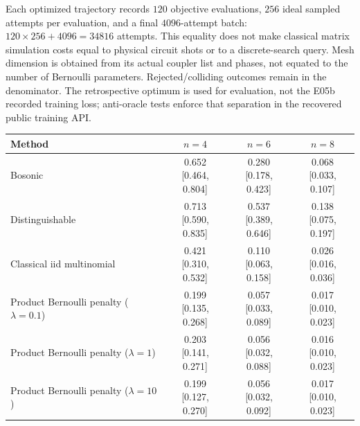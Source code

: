 \documentclass[11pt,a4paper]{article}
\theoremstyle{remark}\newtheorem{remark}[theorem]{Remark}
\begin{document}
Each optimized trajectory records $120$ objective evaluations, $256$ ideal sampled attempts per evaluation, and a final $4096$-attempt batch: $120\times256+4096=34816$ attempts. This equality does not make classical matrix simulation costs equal to physical circuit shots or to a discrete-search query. Mesh dimension is obtained from its actual coupler list and phases, not equated to the number of Bernoulli parameters. Rejected/colliding outcomes remain in the denominator. The retrospective optimum is used for evaluation, not the E05b recorded training loss; anti-oracle tests enforce that separation in the recovered public training API.

\begin{table}[t]
\centering\scriptsize
\setlength{\tabcolsep}{3pt}
\begin{tabular}{lccc}
\hline
Method & $n=4$ & $n=6$ & $n=8$ \\
\hline
Bosonic & \shortstack{0.652\\{[0.464, 0.804]}} & \shortstack{0.280\\{[0.178, 0.423]}} & \shortstack{0.068\\{[0.033, 0.107]}} \\
Distinguishable & \shortstack{0.713\\{[0.590, 0.835]}} & \shortstack{0.537\\{[0.389, 0.646]}} & \shortstack{0.138\\{[0.075, 0.197]}} \\
Classical iid multinomial & \shortstack{0.421\\{[0.310, 0.532]}} & \shortstack{0.110\\{[0.063, 0.158]}} & \shortstack{0.026\\{[0.016, 0.036]}} \\
Product Bernoulli penalty ($\lambda=0.1$) & \shortstack{0.199\\{[0.135, 0.268]}} & \shortstack{0.057\\{[0.033, 0.089]}} & \shortstack{0.017\\{[0.010, 0.023]}} \\
Product Bernoulli penalty ($\lambda=1$) & \shortstack{0.203\\{[0.141, 0.271]}} & \shortstack{0.056\\{[0.032, 0.088]}} & \shortstack{0.016\\{[0.010, 0.023]}} \\
Product Bernoulli penalty ($\lambda=10$) & \shortstack{0.199\\{[0.127, 0.270]}} & \shortstack{0.056\\{[0.032, 0.092]}} & \shortstack{0.017\\{[0.010, 0.023]}} \\

\end{tabular}
\end{table}
\end{document}
